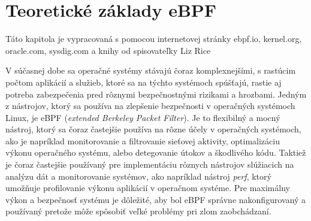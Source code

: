 \section{Teoretické základy eBPF}
Táto kapitola je vypracovaná s pomocou internetovej stránky ebpf.io, kernel.org, oracle.com, sysdig.com a knihy od spisovateľky Liz Rice~\cite{eBPF, kernel, oracle, history, book1}

V súčasnej dobe sa operačné systémy stávajú čoraz komplexnejšími, s rastúcim počtom aplikácií a služieb, ktoré sa na týchto systémoch spúšťajú, 
rastie aj potreba zabezpečenia pred rôznymi bezpečnostnými rizikami a hrozbami. Jedným z nástrojov, ktorý sa používa na zlepšenie bezpečnosti v 
operačných systémoch Linux, je eBPF (\emph{extended Berkeley Packet Filter}). Je to flexibilný a mocný nástroj, ktorý sa čoraz častejšie používa na 
rôzne účely v operačných systémoch, ako je napríklad monitorovanie a filtrovanie sieťovej aktivity, optimalizáciu výkonu operačného systému, 
alebo detegovanie útokov a škodlivého kódu. Taktiež je čoraz častejšie používaný pre implementáciu rôznych nástrojov slúžiacich na analýzu dát 
a monitorovanie systémov, ako napríklad nástroj \emph{perf}, ktorý umožňuje profilovanie výkonu aplikácií v operačnom systéme. Pre maximálny výkon a 
bezpečnosť systému je dôležité, aby bol eBPF správne nakonfigurovaný a používaný pretože môže spôsobiť veľké problémy pri zlom zaobchádzaní.

